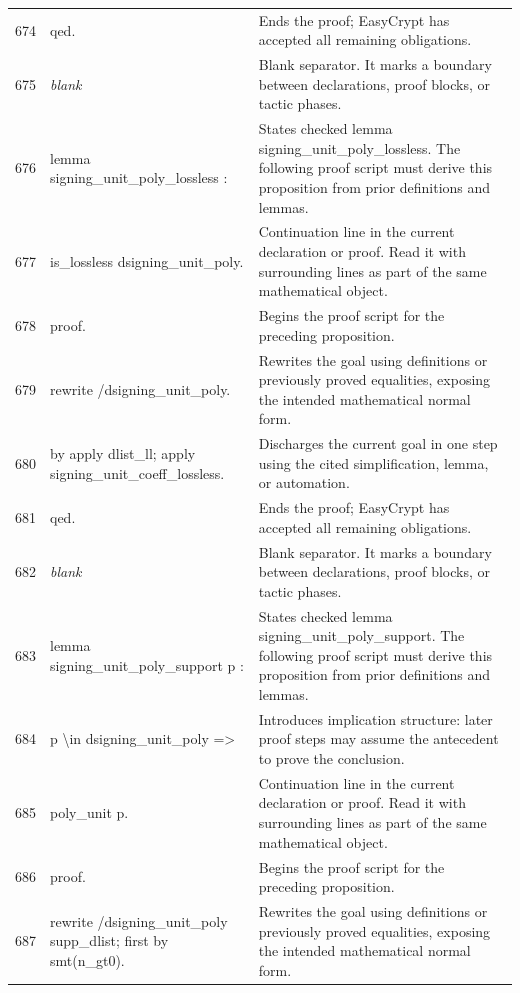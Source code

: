 \documentclass[10pt]{article}
\begin{document}
\begin{longtable}{r L{0.53\textwidth} L{0.37\textwidth}}
674 & {\ttfamily\scriptsize qed.} & Ends the proof; EasyCrypt has accepted all remaining obligations. \\
675 & {\ttfamily\scriptsize \emph{blank}} & Blank separator.  It marks a boundary between declarations, proof blocks, or tactic phases. \\
676 & {\ttfamily\scriptsize lemma signing\_unit\_poly\_lossless :} & States checked lemma signing\_unit\_poly\_lossless.  The following proof script must derive this proposition from prior definitions and lemmas. \\
677 & {\ttfamily\scriptsize   is\_lossless dsigning\_unit\_poly.} & Continuation line in the current declaration or proof.  Read it with surrounding lines as part of the same mathematical object. \\
678 & {\ttfamily\scriptsize proof.} & Begins the proof script for the preceding proposition. \\
679 & {\ttfamily\scriptsize rewrite /dsigning\_unit\_poly.} & Rewrites the goal using definitions or previously proved equalities, exposing the intended mathematical normal form. \\
680 & {\ttfamily\scriptsize by apply dlist\_ll; apply signing\_unit\_coeff\_lossless.} & Discharges the current goal in one step using the cited simplification, lemma, or automation. \\
681 & {\ttfamily\scriptsize qed.} & Ends the proof; EasyCrypt has accepted all remaining obligations. \\
682 & {\ttfamily\scriptsize \emph{blank}} & Blank separator.  It marks a boundary between declarations, proof blocks, or tactic phases. \\
683 & {\ttfamily\scriptsize lemma signing\_unit\_poly\_support p :} & States checked lemma signing\_unit\_poly\_support.  The following proof script must derive this proposition from prior definitions and lemmas. \\
684 & {\ttfamily\scriptsize   p \textbackslash{}in dsigning\_unit\_poly =>} & Introduces implication structure: later proof steps may assume the antecedent to prove the conclusion. \\
685 & {\ttfamily\scriptsize   poly\_unit p.} & Continuation line in the current declaration or proof.  Read it with surrounding lines as part of the same mathematical object. \\
686 & {\ttfamily\scriptsize proof.} & Begins the proof script for the preceding proposition. \\
687 & {\ttfamily\scriptsize rewrite /dsigning\_unit\_poly supp\_dlist; first by smt(n\_gt0).} & Rewrites the goal using definitions or previously proved equalities, exposing the intended mathematical normal form. \\

\end{longtable}
\end{document}
